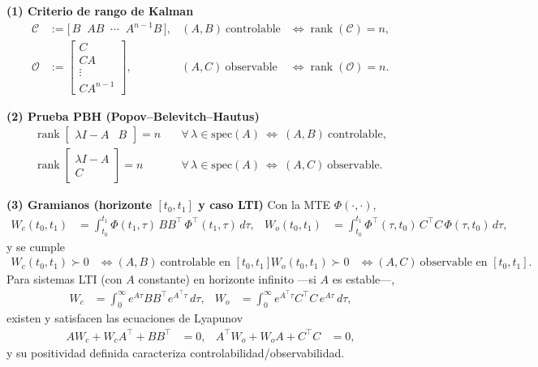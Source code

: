 \documentclass[
  11pt,
  letterpaper,
   addpoints,
   answers
  ]{exam}
\begin{document}
\begin{questions}
\begin{solution}
\textbf{(1) Criterio de rango de Kalman}
\begin{align}
\mathcal C &:= \big[\,B\;\; AB\;\; \cdots\;\; A^{n-1}B\,\big], 
& (A,B)\ \text{controlable} &\iff \operatorname{rank}(\mathcal C)=n,\\[2mm]
\mathcal O &:= 
\begin{bmatrix}
C\\ CA\\ \vdots\\ CA^{n-1}
\end{bmatrix},
& (A,C)\ \text{observable} &\iff \operatorname{rank}(\mathcal O)=n.
\end{align}

\textbf{(2) Prueba PBH (Popov–Belevitch–Hautus)}
\begin{align}
\operatorname{rank}\!\begin{bmatrix}\lambda I-A & B\end{bmatrix}=n\quad 
&\forall\,\lambda\in\mathrm{spec}(A)\ \Longleftrightarrow\ (A,B)\ \text{controlable},\\[2mm]
\operatorname{rank}\!\begin{bmatrix}\lambda I-A\\ C\end{bmatrix}=n\quad 
&\forall\,\lambda\in\mathrm{spec}(A)\ \Longleftrightarrow\ (A,C)\ \text{observable}.
\end{align}

	\textbf{(3) Gramianos (horizonte $[t_0,t_1]$ y caso LTI)}
Con la MTE $\Phi(\cdot,\cdot)$,
\begin{align}
W_c(t_0,t_1) &= \int_{t_0}^{t_1} \Phi(t_1,\tau)\,B B^\top\,\Phi^\top(t_1,\tau)\,d\tau, &
W_o(t_0,t_1) &= \int_{t_0}^{t_1} \Phi^\top(\tau,t_0)\,C^\top C\,\Phi(\tau,t_0)\,d\tau,
\end{align}
y se cumple
\begin{align}
W_c(t_0,t_1)\succ 0 &\iff (A,B)\ \text{controlable en }[t_0,t_1], &
W_o(t_0,t_1)\succ 0 &\iff (A,C)\ \text{observable en }[t_0,t_1].
\end{align}
Para sistemas LTI (con $A$ constante) en horizonte infinito —si $A$ es estable—,
\begin{align}
W_c &= \int_{0}^{\infty} e^{A\tau} B B^\top e^{A^\top \tau}\,d\tau, &
W_o &= \int_{0}^{\infty} e^{A^\top \tau} C^\top C\, e^{A\tau}\,d\tau,
\end{align}
existen y satisfacen las ecuaciones de Lyapunov
\begin{align}
 A W_c + W_c A^\top + B B^\top &= 0, &
 A^\top W_o + W_o A + C^\top C &= 0,
\end{align}
y su positividad definida caracteriza controlabilidad/observabilidad.


\end{solution}
\end{questions}
\end{document}
